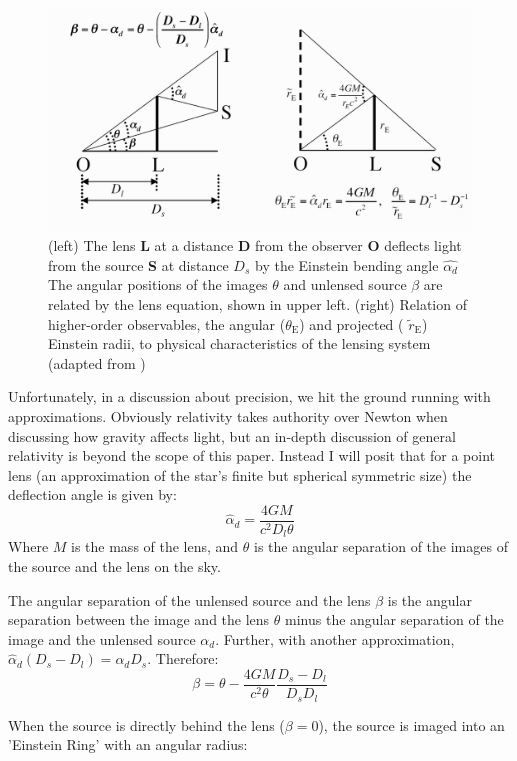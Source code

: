 \documentclass[12pt, a4paper]{article}
\begin{document}
\begin{figure}[H]
\centering
\includegraphics[width=15cm]{symb_mic}
\caption{(left) The lens \textbf{L} at a distance \textbf{D} from the observer \textbf{O}
  deflects light from the source \textbf{S} at distance $D_s$ by the Einstein bending angle $\hat{\alpha _d}$
 The angular positions of the images $\theta$ and unlensed source $\beta$ are related by the lens equation,
 shown in upper left.
 \newline (right) Relation of higher-order observables, the angular ($\theta _{\mathrm E}$) and projected ( $\tilde r_{\mathrm E}$) Einstein radii, to physical characteristics of the lensing system
(adapted from \cite{gaudi})
}
\label{fig:symb_mic}
\end{figure}

Unfortunately, in a discussion about precision, we hit the ground running with approximations.
Obviously relativity takes authority over Newton when discussing how gravity affects light, but an in-depth discussion of general relativity is beyond the scope of this paper.
Instead I will posit that for a point lens (an approximation of the star's finite but spherical symmetric size) the deflection angle is given by:
\[\hat \alpha _d = \frac{4GM}{c^2D_l\theta}\]
Where $M$ is the mass of the lens, and $\theta$ is the angular separation of the images of the source and the lens on the sky.\cite{gl_princ, gaudi}

The angular separation of the unlensed source and the lens $\beta$ is the angular separation between the image and the lens $\theta$ minus the angular separation of the image and the unlensed source $\alpha _d$. Further, with another approximation, $\hat \alpha _d(D_s-D_l)= \alpha _d D_s$. Therefore:
\[\label{eq1} \beta = \theta-\frac{4GM}{c^2\theta}\frac{D_s-D_l}{D_sD_l}\]

When the source is directly behind the lens ($\beta =0$), the source is imaged into an 'Einstein Ring'
\cite{gaudi}
with an angular radius:
\end{document}
